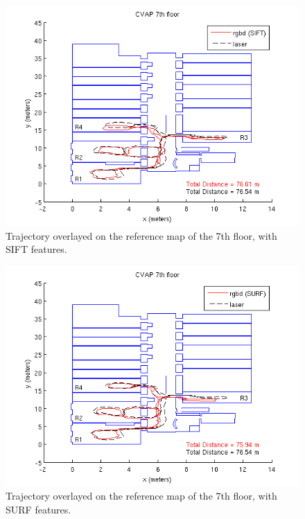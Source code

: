\begin{figure}[H]
\centering
\includegraphics[width=1\textwidth]{figures/cvap_7th_4r_sift}
\caption{Trajectory overlayed on the reference map of the 7th floor, with SIFT features.}
\end{figure}

\begin{figure}[H]
\centering
\includegraphics[width=1\textwidth]{figures/cvap_7th_4r_surf}
\caption{Trajectory overlayed on the reference map of the 7th floor, with SURF features.}
\end{figure}

